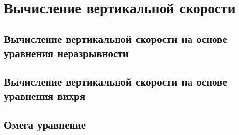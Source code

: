 \chapter{Вычисление вертикальной скорости}

\section{Вычисление вертикальной скорости на основе уравнения неразрывности}

\section{Вычисление вертикальной скорости на основе уравнения вихря}

\section{Омега уравнение}


